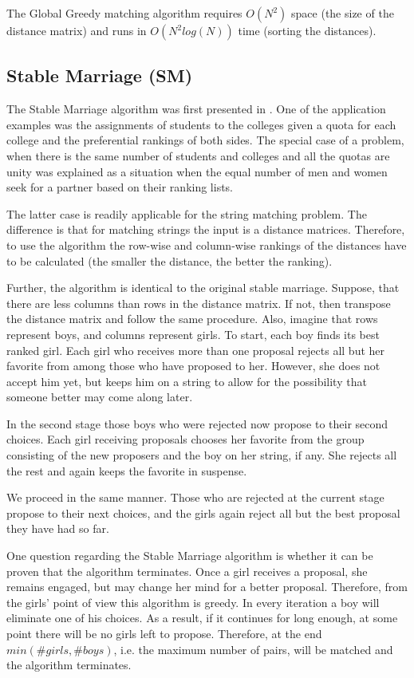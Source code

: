 \documentclass[a4paper,11pt]{article}
\begin{document}
The Global Greedy matching algorithm requires $O(N^2)$ space (the size of the distance matrix) and runs in $O(N^2 log(N))$ time (sorting the distances).

\subsection{Stable Marriage (SM)}

The Stable Marriage algorithm was first presented in \cite{gale}. One of the application examples was the assignments of students to the colleges given a quota for each college and the preferential rankings of both sides. The special case of a problem, when there is the same number of students and colleges and all the quotas are unity was explained as a situation when the equal number of men and women seek for a partner based on their ranking lists.

The latter case is readily applicable for the string matching problem. The difference is that for matching strings the input is a distance matrices. Therefore, to use the algorithm the row-wise and column-wise rankings of the distances have to be calculated (the smaller the distance, the better the ranking).

Further, the algorithm is identical to the original stable marriage. Suppose, that there are less columns than rows in the distance matrix. If not, then transpose the distance matrix and follow the same procedure. Also, imagine that rows represent boys, and columns represent girls. To start, each boy finds its best ranked girl. Each girl who receives more than one proposal rejects all but her favorite from among those who have proposed to her. However, she does not accept him yet, but keeps him on a string to allow for the possibility that someone better may come along later.

In the second stage those boys who were rejected now propose to their second choices. Each girl receiving proposals chooses her favorite from the group consisting of the new proposers and the boy on her string, if any. She rejects all the rest and again keeps the favorite in suspense.

We proceed in the same manner. Those who are rejected at the current stage propose to their next choices, and the girls again reject all but the best proposal they have had so far.

One question regarding the Stable Marriage algorithm is whether it can be proven that the algorithm terminates. Once a girl receives a proposal, she remains engaged, but may change her mind for a better proposal. Therefore, from the girls' point of view this algorithm is greedy. In every iteration a boy will eliminate one of his choices. As a result, if it continues for long enough, at some point there will be no girls left to propose. Therefore, at the end $min(\#girls, \#boys)$, i.e. the maximum number of pairs, will be matched and the algorithm terminates.
\end{document}
